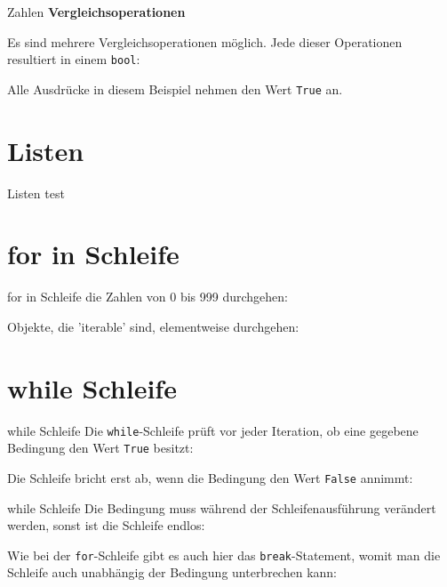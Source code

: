 \begin{frame}{Zahlen}
	\textbf{Vergleichsoperationen}
	\linebreak
	
	Es sind mehrere Vergleichsoperationen möglich. Jede dieser Operationen resultiert in einem \alert{\texttt{bool}}:		
	
	Alle Ausdrücke in diesem Beispiel nehmen den Wert \alert{\texttt{True}} an.
\end{frame}

\section{Listen}
\begin{frame}{Listen}
	test
\end{frame}

\section{for in Schleife}
\begin{frame}{for in Schleife}
	die Zahlen von 0 bis 999 durchgehen:
	
	Objekte, die 'iterable' sind, elementweise durchgehen:
	
	
\end{frame}

\section{while Schleife}
	\begin{frame}{while Schleife}
		Die \alert{\texttt{while}}-Schleife prüft vor jeder Iteration, ob eine gegebene Bedingung den Wert \alert{\texttt{True}} besitzt:
		
		Die Schleife bricht erst ab, wenn die Bedingung den Wert \alert{\texttt{False}} annimmt:
		
	\end{frame}
	
	\begin{frame}{while Schleife}
	Die Bedingung muss während der Schleifenausführung verändert werden, sonst ist die Schleife endlos:
	
	Wie bei der \alert{\texttt{for}}-Schleife gibt es auch hier das \alert{\texttt{break}}-Statement, womit man die Schleife auch unabhängig der Bedingung unterbrechen kann:
	
	\end{frame}

